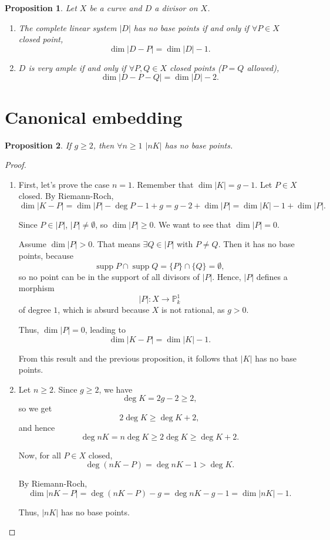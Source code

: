 \documentclass[12pt]{article}
\newtheorem*{proposition}{Proposition}
\theoremstyle{definition}
\DeclareMathOperator{\supp}{supp}
\begin{document}
\begin{proposition}
Let $X$ be a curve and $D$ a divisor on $X$.

\begin{enumerate}[label=\alph*)]
\item The complete linear system $|D|$ has no base points if and only if $\forall P\in X$ closed point,
\[\dim|D-P|=\dim|D|-1.\]

\item $D$ is very ample if and only if $\forall P,Q\in X$ closed points ($P=Q$ allowed),
\[\dim|D-P-Q|=\dim|D|-2.\]
\end{enumerate}
\end{proposition}

\section{Canonical embedding}

\begin{proposition}
If $g\geq2$, then $\forall n\geq1$ $|nK|$ has no base points.
\end{proposition}

\begin{proof}
\begin{enumerate}[label=\alph*)]
\item First, let's prove the case $n=1$. Remember that $\dim|K|=g-1$. Let $P\in X$ closed. By Riemann-Roch,
\[\dim|K-P|=\dim|P|-\deg P-1+g=g-2+\dim|P|=\dim|K|-1+\dim|P|.\]

Since $P\in|P|$, $|P|\neq\emptyset$, so $\dim|P|\geq0$. We want to see that $\dim|P|=0$.

Assume $\dim|P|>0$. That means $\exists Q\in|P|$ with $P\neq Q$. Then it has no base points, because
\[\supp P\cap\supp Q=\{P\}\cap\{Q\}=\emptyset,\]
so no point can be in the support of all divisors of $|P|$. Hence, $|P|$ defines a morphism
\[|P|:X\longrightarrow\mathbb{P}_k^1\]
of degree $1$, which is absurd because $X$ is not rational, as $g>0$.

Thus, $\dim|P|=0$, leading to
\[\dim|K-P|=\dim|K|-1.\]

From this result and the previous proposition, it follows that $|K|$ has no base points.

\item Let $n\geq2$. Since $g\geq2$, we have
\[\deg K=2g-2\geq2,\]
so we get
\[2\deg K\geq\deg K+2,\]
and hence
\[\deg nK=n\deg K\geq2\deg K\geq\deg K+2.\]

Now, for all $P\in X$ closed,
\[\deg(nK-P)=\deg nK-1>\deg K.\]

By Riemann-Roch,
\[\dim|nK-P|=\deg(nK-P)-g=\deg nK-g-1=\dim|nK|-1.\]

Thus, $|nK|$ has no base points.
\end{enumerate}
\end{proof}
\end{document}
